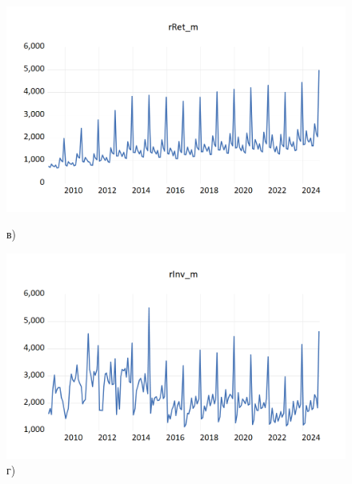 \documentclass[a4paper, 14pt]{extreport}
\numberwithin{equation}{section}
\numberwithin{equation}{section}
\begin{document}
\begin{figure}[h!]
		\begin{minipage}{0.5\textwidth}
			\centering
			\includegraphics[scale=0.4]{images/image07}
			\caption*{в)}
		\end{minipage}%
		\hfill %
		\begin{minipage}{0.5\textwidth}
			\centering
			\includegraphics[scale=0.4]{images/image08}
			\caption*{г)}
		\end{minipage}%
		

\end{figure}
\end{document}
